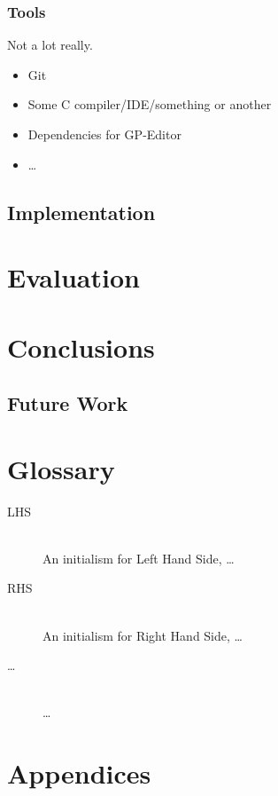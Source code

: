 \documentclass{UoYCSproject}
\begin{document}
\subsection{Tools}
Not a lot really.
\begin{itemize}
  \item Git
  \item Some C compiler/IDE/something or another
  \item Dependencies for GP-Editor
  \item \ldots
\end{itemize}
\section{Implementation}

\chapter{Evaluation}
\chapter{Conclusions}
\section{Future Work}
\chapter{Glossary}
\begin{description}
  \item[LHS] \hfill \\
  An initialism for Left Hand Side, \ldots
  \item[RHS] \hfill \\
  An initialism for Right Hand Side, \ldots
  \item[\ldots] \hfill \\
  \ldots
\end{description}

% 

\chapter{Appendices}
\end{document}
